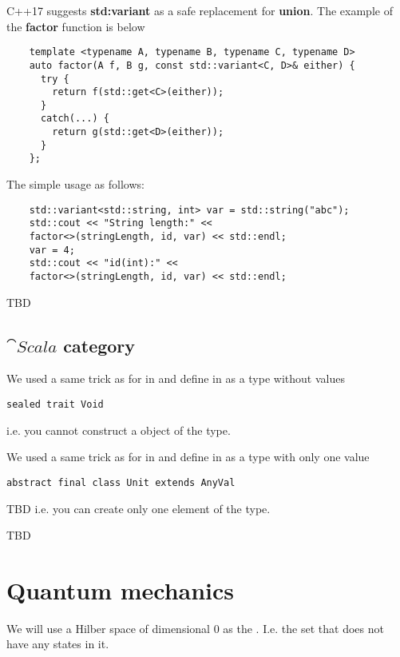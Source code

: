 \begin{example}[Sum][$\cat{C++}$]
  C++17 suggests \textbf{std:variant} as a safe replacement
  for \textbf{union}. The example of the \textbf{factor}
  function is below
  \begin{verbatim}
    template <typename A, typename B, typename C, typename D>
    auto factor(A f, B g, const std::variant<C, D>& either) {
      try {
        return f(std::get<C>(either));               
      }
      catch(...) {
        return g(std::get<D>(either));                              
      }
    };
  \end{verbatim}
  The simple usage as follows:
  \begin{verbatim}
    std::variant<std::string, int> var = std::string("abc");
    std::cout << "String length:" <<
    factor<>(stringLength, id, var) << std::endl;
    var = 4;
    std::cout << "id(int):" <<
    factor<>(stringLength, id, var) << std::endl;    
  \end{verbatim}

\end{example}
TBD
\subsection{$\cat{Scala}$ category}
\begin{example}
\label{ex:scala_initial_object}
We used a same trick as for  in
 and define
 in  as a
type without values 
\begin{verbatim}
sealed trait Void
\end{verbatim}
i.e. you cannot construct a object of the type.
\end{example}

\begin{example}
\label{ex:scala_terminal_object}
We used a same trick as for 
in  and define
 in  as a
type with only one value
\begin{verbatim}
abstract final class Unit extends AnyVal
\end{verbatim}
TBD
i.e. you can create only one element of the type.
\end{example}

TBD

\section{Quantum mechanics}
\begin{example}
\label{ex:quant_initial_object}
We will use a Hilber space of dimensional 0 as the
. I.e. the set that does not have any
states in it.
\end{example}

